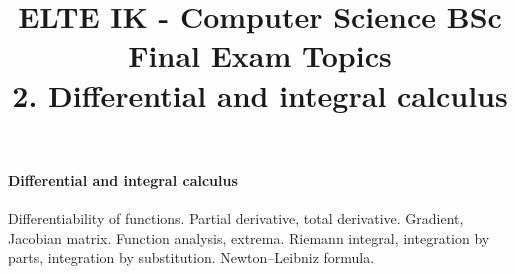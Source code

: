 \documentclass[margin=0px]{article}
\title{\textbf{{\Large ELTE IK - Computer Science BSc} \vspace{0.2cm} \\ {\huge Final Exam Topics}} \vspace{0.3cm} \\ 2. Differential and integral calculus}
\author{}
\date{}
\newenvironment{tetel}[1]{\paragraph{#1 \\}}{}
\begin{document}
\maketitle

\begin{center}
\end{center}

\begin{tetel}{Differential and integral calculus}
    Differentiability of functions. Partial derivative, total derivative. Gradient, Jacobian matrix. Function analysis, extrema. Riemann integral, integration by parts, integration by substitution. Newton--Leibniz formula.
\end{tetel}
\end{document}
